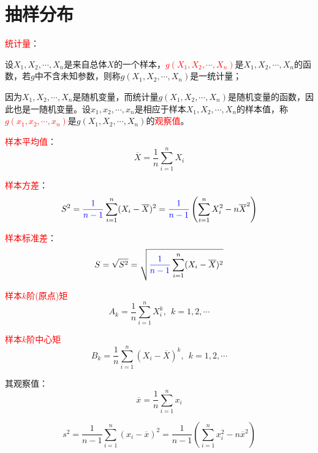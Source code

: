 \documentclass[12pt,a4paper]{article}
\begin{document}
\section{抽样分布}
\textcolor{red}{统计量}：

设$X_1, X_2, \cdots, X_n$是来自总体$X$的一个样本，\textcolor{red}{$g(X_1, X_2, \cdots, X_n)$}是$X_1, X_2, \cdots, X_n$的函数，若$g$中不含未知参数，则称$g(X_1, X_2, \cdots, X_n)$是一统计量；

因为$X_1, X_2, \cdots, X_n$是随机变量，而统计量$g(X_1, X_2, \cdots, X_n)$是随机变量的函数，因此也是一随机变量。设$x_1, x_2, \cdots, x_n$是相应于样本$X_1, X_2, \cdots, X_n$的样本值，称\textcolor{red}{$g(x_1, x_2, \cdots, x_n)$}是$g(X_1, X_2, \cdots, X_n)$的\textcolor{red}{观察值}。

\textcolor{red}{样本平均值}：
\begin{equation}
\overline{X} = \frac{1}{n} \sum_{i=1}^{n} X_i
\end{equation}

\textcolor{red}{样本方差}：
\begin{equation}
S^2 = \textcolor{blue}{\frac{1}{n-1}} \sum_{i=1}^{n} (X_i - \overline{X})^2 = \textcolor{blue}{\frac{1}{n-1}} \left( \sum_{i=1}^{n} X_i^2 - n \overline{X}^2  \right)
\end{equation}

\textcolor{red}{样本标准差}：
\begin{equation}
S = \sqrt{S^2} = \sqrt{ \textcolor{blue}{\frac{1}{n-1}} \sum_{i=1}^{n} (X_i - \overline{X})^2 }
\end{equation}

\textcolor{red}{样本$k$阶(原点)矩}
\begin{equation}
A_k = \frac{1}{n} \sum_{i=1}^{n} X_i^k, ~~k = 1,2,\cdots
\end{equation}

\textcolor{red}{样本$k$阶中心矩}
\begin{equation}
B_k = \frac{1}{n} \sum_{i=1}^{n} (X_i-\overline{X})^k, ~~k = 1,2,\cdots
\end{equation}

其观察值：
\begin{equation}
\overline{x} = \frac{1}{n} \sum_{i=1}^{n} x_i
\end{equation}

\begin{equation}
s^2 = \frac{1}{n-1} \sum_{i=1}^{n} (x_i - \overline{x})^2 = \frac{1}{n-1} \left( \sum_{i=1}^{n} x_i^2 - n \overline{x}^2  \right)
\end{equation}
\end{document}

